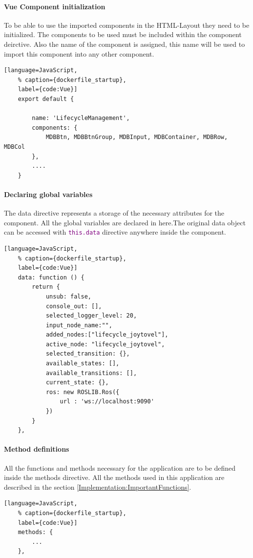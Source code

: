 \paragraph{Vue Component initialization} To be able to use the imported components in the HTML-Layout they need to be initialized. The components to be used must be included within the component deirctive. Also the name of the component is assigned, this name will be used to import this component into any other component. 
\begin{lstlisting}[language=JavaScript,
	% caption={dockerfile_startup}, 
	label={code:Vue}]
	export default {
	
		name: 'LifecycleManagement',
		components: {
			MDBBtn, MDBBtnGroup, MDBInput, MDBContainer, MDBRow, MDBCol
		},
		....
	}
\end{lstlisting}

\paragraph{Declaring global variables} The data directive represents a storage of the necessary attributes for the component. All the global variables are declared in here.The original data object can be accessed with \texttt{\textcolor{purple}{this.data}} directive anywhere inside the component.
\begin{lstlisting}[language=JavaScript,
	% caption={dockerfile_startup}, 
	label={code:Vue}]
	data: function () {
		return {
			unsub: false,
			console_out: [],
			selected_logger_level: 20,
			input_node_name:"",
			added_nodes:["lifecycle_joytovel"],
			active_node: "lifecycle_joytovel",
			selected_transition: {},
			available_states: [],
			available_transitions: [],
			current_state: {},
			ros: new ROSLIB.Ros({
				url : 'ws://localhost:9090'
			})
		}
	},
\end{lstlisting}

\paragraph{Method definitions} All the functions and methods necessary for the application are to be defined inside the methods directive. All the methods used in this application are described in the section \ref{Implementation:ImportantFunctions}.
\begin{lstlisting}[language=JavaScript,
	% caption={dockerfile_startup}, 
	label={code:Vue}]
	methods: {
		...
	},
\end{lstlisting}


